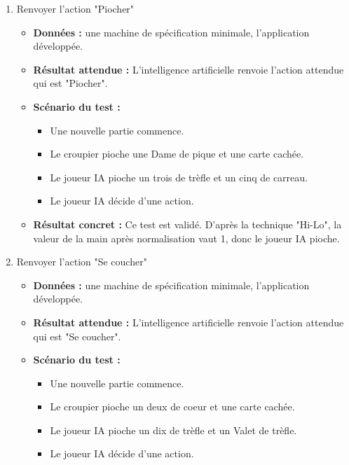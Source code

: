 \begin{enumerate}
    \begin{enumerate}
        \item Renvoyer l'action "Piocher"
        \begin{itemize}
            \item \textbf{Données :} une machine de spécification minimale, l'application développée.
            \item \textbf{Résultat attendue :} L'intelligence artificielle renvoie l'action attendue qui est "Piocher".
            \item \textbf{Scénario du test :}
            \begin{itemize}
                \item Une nouvelle partie commence.
                \item Le croupier pioche une Dame de pique et une carte cachée.
                \item Le joueur IA pioche un trois de trèfle et un cinq de carreau.
                \item Le joueur IA décide d'une action.
            \end{itemize}
            
            \item \textbf{Résultat concret : } Ce test est validé. D'après la technique "Hi-Lo", la valeur de la main après normalisation vaut 1, donc le joueur IA pioche.
        \end{itemize}

        \item Renvoyer l'action "Se coucher"
        \begin{itemize}
            \item \textbf{Données :} une machine de spécification minimale, l'application développée.
            \item \textbf{Résultat attendue :} L'intelligence artificielle renvoie l'action attendue qui est "Se coucher".
            \item \textbf{Scénario du test :}
            \begin{itemize}
                \item Une nouvelle partie commence.
                \item Le croupier pioche un deux de coeur et une carte cachée.
                \item Le joueur IA pioche un dix de trèfle et un Valet de trèfle.
                \item Le joueur IA décide d'une action.
            \end{itemize}
            

\end{itemize}
\end{enumerate}
\end{enumerate}
